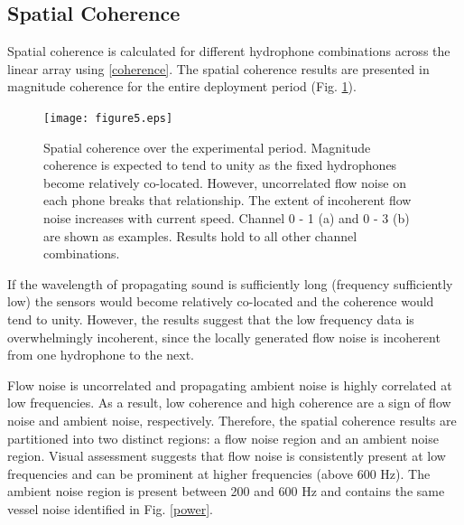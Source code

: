 \documentclass[12pt,journal,onecolumn]{IEEEtran}
\begin{document}
\subsection{Spatial Coherence}
Spatial coherence is calculated for different hydrophone combinations across the linear array using \eqref{coherence}. The spatial coherence results are presented in magnitude coherence for the entire deployment period (Fig. \ref{f:coherence}). %
\begin{figure}[!t]
	\begin{center}
		\texttt{[image: figure5.eps]} %
	\end{center}
	\caption[Hydrophone spatial coherence]{
	\label{f:coherence}
	Spatial coherence over the experimental period. Magnitude coherence is expected to tend to unity as the fixed hydrophones become relatively co-located. However, uncorrelated flow noise on each phone breaks that relationship. The extent of incoherent flow noise increases with current speed. Channel 0 - 1 (a) and 0 - 3 (b) are shown as examples. Results hold to all other channel combinations.}
\end{figure}
If the wavelength of propagating sound is sufficiently long (frequency sufficiently low) the sensors would become relatively co-located and the coherence would tend to unity. %
However, the results suggest that the low frequency data is overwhelmingly incoherent, since the locally generated flow noise is incoherent from one hydrophone to the next. 

Flow noise is uncorrelated and propagating ambient noise is highly correlated at low frequencies. As a result, low coherence and high coherence are a sign of flow noise and ambient noise, respectively. Therefore, the spatial coherence results are partitioned into two distinct regions: a flow noise region and an ambient noise region. Visual assessment suggests that flow noise is consistently present at low frequencies and can be prominent at higher frequencies (above 600 Hz). The ambient noise region is present between 200 and 600 Hz and contains the same vessel noise identified in Fig. \ref{power}. 
\end{document}
